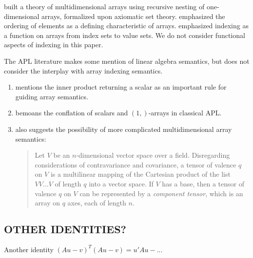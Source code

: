 \cite{More1973} built a theory of multidimensional arrays using recursive
nesting of one-dimensional arrays, formalized upon axiomatic set theory.
\cite{Ghandour1973} emphasized the ordering of elements as a defining
characteristic of arrays. \cite{Gerth1988} emphasized indexing as a function on
arrays from index sets to value sets. We do not consider functional aspects of
indexing in this paper.

The APL literature makes some mention of linear algebra semantics, but does not
consider the interplay with array indexing semantics.

\begin{enumerate}
\item \cite{More1973} mentions the inner product returning a scalar as an
	important rule for guiding array semantics.

\item \cite{Haegi1976} bemoans the conflation of scalars and $(1,)$-arrays in
	classical APL.

\item \cite[p. 153]{More1973} also suggests the possibility of more complicated
	multidimensional array semantics:

\begin{quote}
Let $V$ be an $n$-dimensional vector space over a field. Disregarding
considerations of contravariance and covariance, a tensor of valence $q$ on $V$
is a multilinear mapping of the Cartesian product of the list $V V \dots V$ of
length $q$ into a vector space. If $V$ has a base, then a tensor of valence $q$
on $V$ can be represented by a \textit{component tensor}, which is an array on
$q$ axes, each of length $n$.
\end{quote}

\end{enumerate}


\subsection{OTHER IDENTITIES?}
Another identity ${(Au - v)}^T(Au - v) = u'Au -...$
